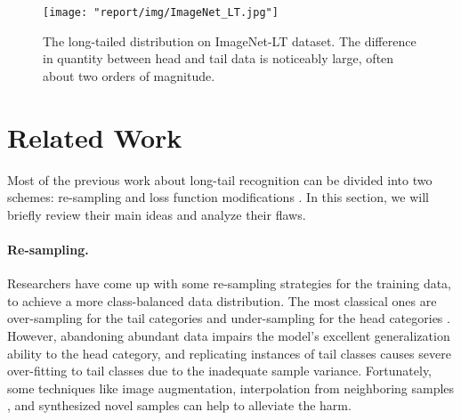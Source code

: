 \documentclass{article}
\begin{document}
\begin{figure}
    \centering
    \texttt{[image: "report/img/ImageNet\_LT.jpg"]}
    \caption{The long-tailed distribution on ImageNet-LT dataset. The difference in quantity between head and tail data is noticeably large, often about two orders of magnitude.}
    \label{fig1}
\end{figure}



\section{Related Work}

Most of the previous work about long-tail recognition can be divided into two schemes: re-sampling \cite{burnaev2015influence,chawla2002smote,drummond2003c4,estabrooks2004multiple,han2005borderline,huang2016learning,pereira2021toward} and loss function modifications \cite{cao2019learning,cui2019class,koziarski2021two,lin2017focal,wang2021adaptive,zhang2021mining}. In this section, we will briefly review their main ideas and analyze their flaws.

\paragraph{Re-sampling.}Researchers have come up with some re-sampling strategies for the training data, to achieve a more class-balanced data distribution. The most classical ones are over-sampling for the tail categories \cite{han2005borderline} and under-sampling for the head categories \cite{drummond2003c4}. However, abandoning abundant data impairs the model's excellent generalization ability to the head category, and replicating instances of tail classes causes severe over-fitting to tail classes due to the inadequate sample variance. Fortunately, some techniques like image augmentation, interpolation from neighboring samples \cite{chawla2002smote}, and synthesized novel samples \cite{he2008adaptive,zou2018unsupervised} can help to alleviate the harm.
\end{document}
